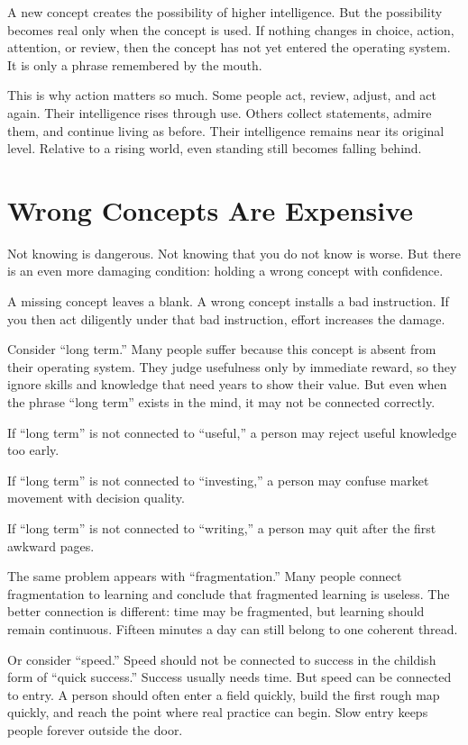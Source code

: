 A new concept creates the possibility of higher intelligence. But the possibility becomes real only when the concept is used. If nothing changes in choice, action, attention, or review, then the concept has not yet entered the operating system. It is only a phrase remembered by the mouth.

This is why action matters so much. Some people act, review, adjust, and act again. Their intelligence rises through use. Others collect statements, admire them, and continue living as before. Their intelligence remains near its original level. Relative to a rising world, even standing still becomes falling behind.

\section*{Wrong Concepts Are Expensive}

Not knowing is dangerous. Not knowing that you do not know is worse. But there is an even more damaging condition: holding a wrong concept with confidence.

A missing concept leaves a blank. A wrong concept installs a bad instruction. If you then act diligently under that bad instruction, effort increases the damage.

Consider ``long term.'' Many people suffer because this concept is absent from their operating system. They judge usefulness only by immediate reward, so they ignore skills and knowledge that need years to show their value. But even when the phrase ``long term'' exists in the mind, it may not be connected correctly.

If ``long term'' is not connected to ``useful,'' a person may reject useful knowledge too early.

If ``long term'' is not connected to ``investing,'' a person may confuse market movement with decision quality.

If ``long term'' is not connected to ``writing,'' a person may quit after the first awkward pages.

The same problem appears with ``fragmentation.'' Many people connect fragmentation to learning and conclude that fragmented learning is useless. The better connection is different: time may be fragmented, but learning should remain continuous. Fifteen minutes a day can still belong to one coherent thread.

Or consider ``speed.'' Speed should not be connected to success in the childish form of ``quick success.'' Success usually needs time. But speed can be connected to entry. A person should often enter a field quickly, build the first rough map quickly, and reach the point where real practice can begin. Slow entry keeps people forever outside the door.

